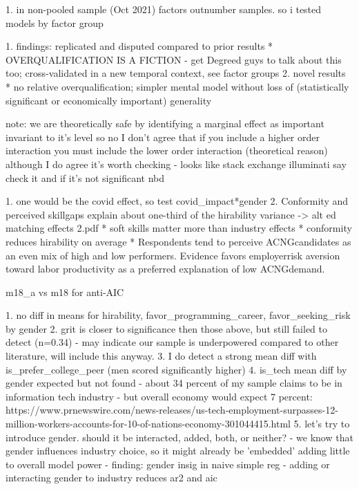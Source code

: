 \documentclass[review]{elsarticle}
\begin{document}
1. in non-pooled sample (Oct 2021) factors outnumber samples. so i tested models by factor group


1. findings: replicated and disputed compared to prior results
    * OVERQUALIFICATION IS A FICTION - get Degreed guys to talk about this too; cross-validated in a new temporal context, see factor groups
2. novel results
    * no relative overqualification; simpler mental model without loss of (statistically significant or economically important) generality

note: we are theoretically safe by identifying a marginal effect as important invariant to it's level
    so no I don't agree that if you include a higher order interaction you must include the lower order interaction (theoretical reason)
    although I do agree it's worth checking - looks like stack exchange illuminati say check it and if it's not significant nbd

1. one would be the covid effect, so test covid_impact*gender
2.  Conformity  and  perceived  skillgaps  explain  about  one-third  of  the  hirability  variance -> alt ed matching effects 2.pdf
    * soft skills matter more than industry effects
    * conformity reduces hirability on average
    * Respondents tend to perceive ACNGcandidates as an even mix of high and low performers.  Evidence favors employerrisk aversion toward labor productivity as a preferred explanation of low ACNGdemand.

m18_a vs m18 for anti-AIC


1. no diff in means for hirability, favor_programming_career, favor_seeking_risk by gender
2. grit is closer to significance then those above, but still failed to detect (n=0.34)
    - may indicate our sample is underpowered compared to other literature, will include this anyway.
3. I do detect a strong mean diff with is_prefer_college_peer (men scored significantly higher)
4. is_tech mean diff by gender expected but not found
    - about 34 percent of my sample claims to be in information tech industry
    - but overall economy would expect 7 percent: https://www.prnewswire.com/news-releases/us-tech-employment-surpasses-12-million-workers-accounts-for-10-of-nations-economy-301044415.html
5. let's try to introduce gender. should it be interacted, added, both, or neither?
    - we know that gender influences industry choice, so it might already be 'embedded' adding little to overall model power
    - finding: gender insig in naive simple reg
    - adding or interacting gender to industry reduces ar2 and aic
\end{document}
